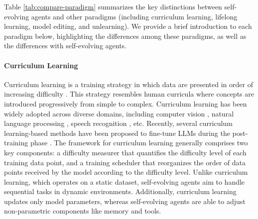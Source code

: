 \documentclass[10pt]{article} %
\begin{document}
Table \ref{tab:compare-paradigm} summarizes the key distinctions between self-evolving agents and other paradigms (including curriculum learning, lifelong learning, model editing, and unlearning). 
We provide a brief introduction to each paradigm below,  highlighting the differences among these paradigms, as well as the differences with self-evolving agents.

\paragraph{Curriculum Learning}
Curriculum learning is a training strategy in which data are presented in order of increasing difficulty \citep{bengio2009curriculum, wang2021survey}. This strategy resembles human curricula where concepts are introduced progressively from simple to complex. Curriculum learning has been widely adopted across diverse domains, including computer vision \citep{guo2018curriculumnet, jiang2014easy, liu2023towards}, natural language processing \citep{platanios2019competence, tay2019simple}, speech recognition \citep{braun2017curriculum, lotfian2019curriculum}, etc. Recently, several curriculum learning-based methods have been proposed to fine-tune LLMs during the post-training phase \citep{wang2025dump, zhang2025preference, parashar2025curriculum, zhang2025learning, li2025curriculum}. The framework for curriculum learning generally comprises two key components: a difficulty measurer that quantifies the difficulty level of each training data point, and a training scheduler that reorganizes the order of data points received by the model according to the difficulty level. 
Unlike curriculum learning, which operates on a static dataset, self-evolving agents aim to handle sequential tasks in dynamic environments. Additionally, curriculum learning updates only model parameters, whereas self-evolving agents are able to adjust non-parametric components like memory and tools.
\end{document}
